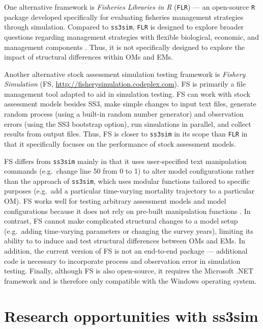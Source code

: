 \documentclass[11pt]{article}
\begin{document}
One alternative framework is \emph{Fisheries Libraries in R} (\texttt{FLR}) \cite{kell2007} --- an open-source \texttt{R} package developed specifically for evaluating fisheries management strategies through simulation. Compared to \texttt{ss3sim}, \texttt{FLR} is designed to explore broader questions regarding management strategies with flexible biological, economic, and management components \cite{hillary2009}. Thus, it is not specifically designed to explore the impact of structural differences within OMs and EMs.

Another alternative stock assessment simulation testing framework is \emph{Fishery Simulation} (FS, \url{http://fisherysimulation.codeplex.com}). FS is primarily a file management tool adapted to aid in simulation testing. FS can work with stock assessment models besides SS3, make simple changes to input text files, generate random process (using a built-in random number generator) and observation errors (using the SS3 bootstrap option), run simulations in parallel, and collect results from output files. Thus, FS is closer to \texttt{ss3sim} in its scope than \texttt{FLR} in that it specifically focuses on the performance of stock assessment models.

FS differs from \texttt{ss3sim} mainly in that it uses user-specified text manipulation commands (e.g.~change line 50 from 0 to 1) to alter model configurations rather than the approach of \texttt{ss3sim}, which uses modular functions tailored to specific purposes (e.g.~add a particular time-varying mortality trajectory to a particular OM). FS works well for testing arbitrary assessment models and model configurations because it does not rely on pre-built manipulation functions \cite{lee2012, piner2011, lee2011}. In contrast, FS cannot make complicated structural changes to a model setup (e.g.~adding time-varying parameters or changing the survey years), limiting its ability to to induce and test structural differences between OMs and EMs. In addition, the current version of FS is not an end-to-end package --- additional code is necessary to incorporate process and observation error in simulation testing. Finally, although FS is also open-source, it requires the Microsoft .NET framework and is therefore only compatible with the Windows operating system.

\section*{Research opportunities with ss3sim}
\end{document}
